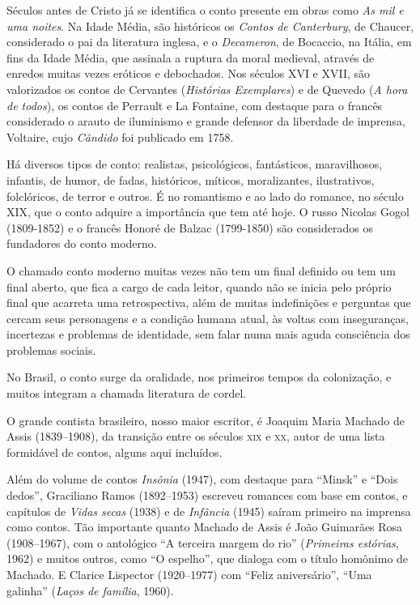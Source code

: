 Séculos antes de Cristo já se identifica o conto presente em obras como \textit{As mil e uma noites}. Na Idade Média, são históricos os \textit{Contos de Canterbury}, de Chaucer, considerado o pai da literatura inglesa, e o \textit{Decameron}, de Bocaccio, na Itália, em fins da Idade Média, que assinala a ruptura da moral medieval, através de enredos muitas vezes eróticos e debochados. Nos séculos XVI e XVII, são valorizados os contos de Cervantes (\textit{Histórias Exemplares}) e de Quevedo (\textit{A hora de todos}), os contos de Perrault e La Fontaine, com destaque para o francês considerado o arauto de iluminismo e grande defensor da liberdade de imprensa, Voltaire, cujo \textit{Cândido} foi publicado em 1758. 

Há diversos tipos de conto: realistas, psicológicos, fantásticos, maravilhosos, infantis, de humor, de fadas, históricos, míticos, moralizantes, ilustrativos, folclóricos, de terror e outros. É no romantismo e ao lado do romance, no século XIX, que o conto adquire a importância que tem até hoje. O russo Nicolas Gogol (1809-1852) e o francês Honoré de Balzac (1799-1850) são considerados os fundadores do conto moderno.

O chamado conto moderno muitas vezes não tem um final definido ou tem um final aberto, que fica a cargo de cada leitor, quando não se inicia pelo próprio final que acarreta uma retrospectiva, além de muitas indefinições e perguntas que cercam seus personagens e a condição humana atual, às voltas com inseguranças, incertezas e problemas de identidade, sem falar numa mais aguda consciência dos problemas sociais.

No Brasil, o conto surge da oralidade, nos primeiros tempos da
colonização, e muitos integram a chamada literatura de cordel.

O grande contista brasileiro, nosso maior escritor, é Joaquim Maria
Machado de Assis (1839--1908), da transição entre os séculos \textsc{xix} e \textsc{xx},
autor de uma lista formidável de contos, alguns aqui incluídos.

Além do volume de contos \emph{Insônia} (1947), com destaque para
``Minsk'' e ``Dois dedos'', Graciliano Ramos (1892--1953) escreveu
romances com base em contos, e capítulos de \emph{Vidas secas} (1938) e
de \emph{Infância} (1945) saíram primeiro na imprensa como contos. Tão
importante quanto Machado de Assis é João Guimarães Rosa (1908--1967),
com o antológico ``A terceira margem do rio'' (\emph{Primeiras
estórias}, 1962) e muitos outros, como ``O espelho'', que dialoga com o
título homônimo de Machado. E Clarice Lispector (1920--1977) com ``Feliz
aniversário'', ``Uma galinha'' (\emph{Laços de família}, 1960).

